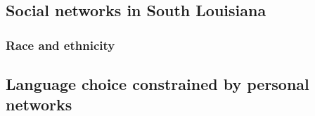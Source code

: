     \subsection{Social networks in South Louisiana}
      \subsubsection{Race and ethnicity}
    \subsection{Language choice constrained by personal networks}
